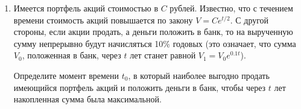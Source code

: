 \documentclass[a5paper,11pt]{extarticle}
\begin{document}
\begin{enumerate}
    \item 
       Имеется портфель акций стоимостью в  $C$  рублей. Известно, что с течением времени стоимость акций повышается по закону  $V=Ce^{t/2}$. С другой стороны, если акции продать, а деньги положить в банк, то на вырученную сумму непрерывно будут начисляться 10\% годовых (это означает, что сумма $V_0$, положенная в банк, через  $t$ лет станет равной $V_1=V_0e^{0.1t}$).
       
       Определите момент времени  $t_0$, в который наиболее выгодно продать имеющийся портфель акций и положить деньги в банк, чтобы через  $t$  лет накопленная сумма была максимальной.
       
\end{enumerate}
\end{document}
